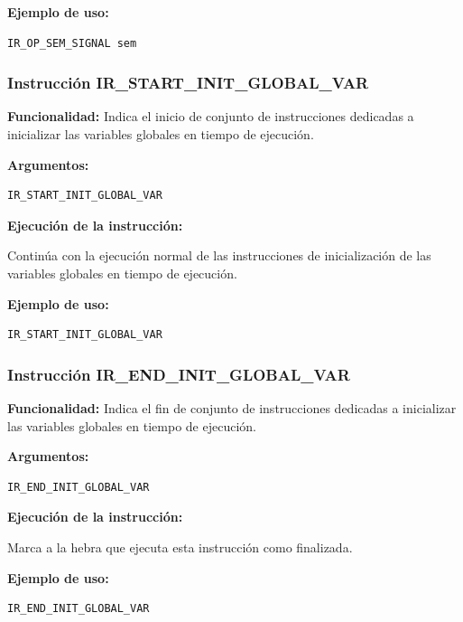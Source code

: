 \noindent
\textbf{Ejemplo de uso:}
\begin{verbatim}
IR_OP_SEM_SIGNAL sem
\end{verbatim}

\subsubsection{Instrucción IR\_START\_INIT\_GLOBAL\_VAR}\label{subsubsec:IR_START_INIT_GLOBAL_VAR}
\noindent
\textbf{Funcionalidad:} Indica el inicio de conjunto de instrucciones dedicadas a inicializar las variables globales en tiempo de ejecución.

\noindent
\textbf{Argumentos:}
\begin{verbatim}
IR_START_INIT_GLOBAL_VAR
\end{verbatim}

\noindent
\textbf{Ejecución de la instrucción:}
\vspace{0.3cm}

\noindent
Continúa con la ejecución normal de las instrucciones de inicialización de las variables globales en tiempo de ejecución.
\vspace{0.3cm}

\noindent
\textbf{Ejemplo de uso:}
\begin{verbatim}
IR_START_INIT_GLOBAL_VAR
\end{verbatim}

\subsubsection{Instrucción IR\_END\_INIT\_GLOBAL\_VAR}\label{subsubsec:IR_END_INIT_GLOBAL_VAR}
\noindent
\textbf{Funcionalidad:} Indica el fin de conjunto de instrucciones dedicadas a inicializar las variables globales en tiempo de ejecución.

\noindent
\textbf{Argumentos:}
\begin{verbatim}
IR_END_INIT_GLOBAL_VAR
\end{verbatim}

\noindent
\textbf{Ejecución de la instrucción:}
\vspace{0.3cm}

\noindent
Marca a la hebra que ejecuta esta instrucción como finalizada.
\vspace{0.3cm}

\noindent
\textbf{Ejemplo de uso:}
\begin{verbatim}
IR_END_INIT_GLOBAL_VAR
\end{verbatim}

